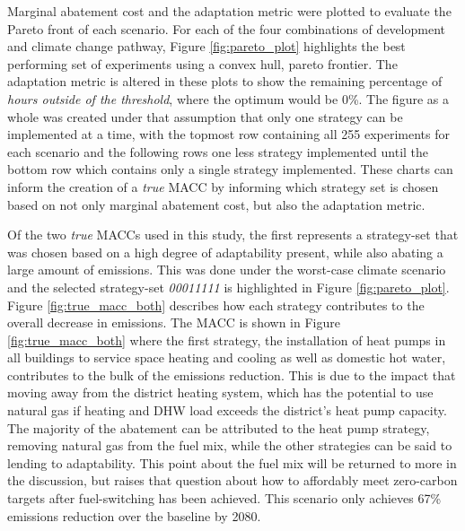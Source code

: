 \documentclass[twocolumn, a4paper,10pt]{article}
\begin{document}
Marginal abatement cost and the adaptation metric were plotted to evaluate the Pareto front of each scenario. For each of the four combinations of development and climate change pathway, Figure \ref{fig:pareto_plot} highlights the best performing set of experiments using a convex hull, pareto frontier. The adaptation metric is altered in these plots to show the remaining percentage of \textit{hours outside of the threshold}, where the optimum would be 0\%. The figure as a whole was created under that assumption that only one strategy can be implemented at a time, with the topmost row containing all 255 experiments for each scenario and the following rows one less strategy implemented until the bottom row which contains only a single strategy implemented. These charts can inform the creation of a \textit{true} MACC by informing which strategy set is chosen based on not only marginal abatement cost, but also the adaptation metric.

Of the two \textit{true} MACCs used in this study, the first represents a strategy-set that was chosen based on a high degree of adaptability present, while also abating a large amount of emissions. This was done under the worst-case climate scenario and the selected strategy-set \textit{00011111} is highlighted in Figure \ref{fig:pareto_plot}. Figure \ref{fig:true_macc_both} describes how each strategy contributes to the overall decrease in emissions. The MACC is shown in Figure \ref{fig:true_macc_both} where the first strategy, the installation of heat pumps in all buildings to service space heating and cooling as well as domestic hot water, contributes to the bulk of the emissions reduction. This is due to the impact that moving away from the district heating system, which has the potential to use natural gas if heating and DHW load exceeds the district's heat pump capacity. The majority of the abatement can be attributed to the heat pump strategy, removing natural gas from the fuel mix, while the other strategies can be said to lending to adaptability. This point about the fuel mix will be returned to more in the discussion, but raises that question about how to affordably meet zero-carbon targets after fuel-switching has been achieved. This scenario only achieves 67\% emissions reduction over the baseline by 2080.


\end{document}

